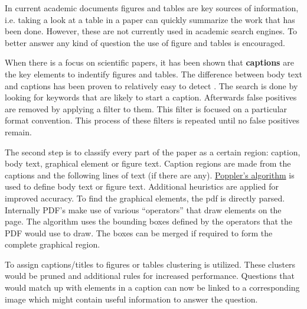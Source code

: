 In current academic documents figures and tables are key sources of information, i.e. taking a look at a table in a paper can quickly summarize the work that has been done.
However, these are not currently used in academic search engines.
To better answer any kind of question the use of figure and tables is encouraged.

When there is a focus on scientific papers, it has been shown that \textbf{captions} are the key elements to indentify figures and tables.
The difference between body text and captions has been proven to relatively easy to detect \cite{pdffigures2}.
The search is done by looking for keywords that are likely to start a caption.
Afterwards false positives are removed by applying a filter to them.
This filter is focused on a particular format convention.
This process of these filters is repeated until no false positives remain.

The second step is to classify every part of the paper as a certain region: caption, body text, graphical element or figure text.
Caption regions are made from the captions and the following lines of text (if there are any).
\href{https://poppler.freedesktop.org/}{Poppler's algorithm} is used to define body text or figure text.
Additional heuristics are applied for improved accuracy. 
To find the graphical elements, the pdf is directly parsed. 
Internally PDF's make use of various ``operators'' that draw elements on the page. 
The algorithm uses the bounding boxes defined by the operators that the PDF would use to draw.
The boxes can be merged if required to form the complete graphical region.

To assign captions/titles to figures or tables clustering is utilized. 
These clusters would be pruned and additional rules for increased performance.
Questions that would match up with elements in a caption can now be linked to a corresponding image which might contain useful information to answer the question.

